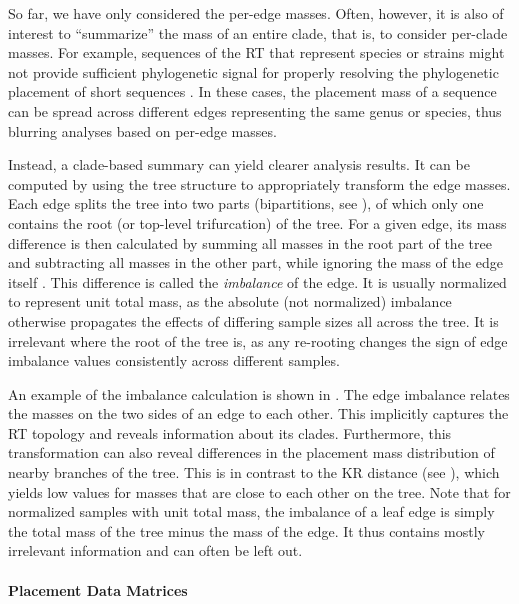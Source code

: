 So far, we have only considered the per-edge masses.
Often, however, it is also of interest to ``summarize'' the mass of an entire clade, that is, to consider per-clade masses.
For example, sequences of the \ac{RT} that represent species or strains might not provide sufficient phylogenetic signal
for properly resolving the phylogenetic placement of short sequences \cite{Dunthorn2014}.
In these cases, the placement mass of a sequence can be spread across different edges representing the same genus or species,
thus blurring analyses based on per-edge masses.

Instead, a clade-based summary can yield clearer analysis results.
It can be computed by using the tree structure to appropriately transform the edge masses.
Each edge splits the tree into two parts
(bipartitions, see ),
of which only one contains the root (or top-level trifurcation) of the tree.
For a given edge, its mass difference is then calculated by summing all masses in the root part of the tree
and subtracting all masses in the other part,
while ignoring the mass of the edge itself \cite{Matsen2011a}.
This difference is called the \emph{imbalance} of the edge.
It is usually normalized to represent unit total mass,
as the absolute (not normalized) imbalance otherwise propagates the effects of differing sample sizes all across the tree.
It is irrelevant where the root of the tree is,
as any re-rooting changes the sign of edge imbalance values consistently across different samples.

An example of the imbalance calculation is shown in .
The edge imbalance relates the masses on the two sides of an edge to each other.
This implicitly captures the \ac{RT} topology and reveals information about its clades.
Furthermore, this transformation can also reveal differences in the placement mass distribution
of nearby branches of the tree.
This is in contrast to the KR distance
(see ),
which yields low values for masses that are close to each other on the tree.
Note that for normalized samples with unit total mass,
the imbalance of a leaf edge is simply the total mass of the tree minus the mass of the edge.
It thus contains mostly irrelevant information and can often be left out.

\paragraph{Placement Data Matrices}
\label{ch:Foundations:sec:PhylogeneticPlacement:sub:PlacementProcessing:par:PlacementDataMatrices}

